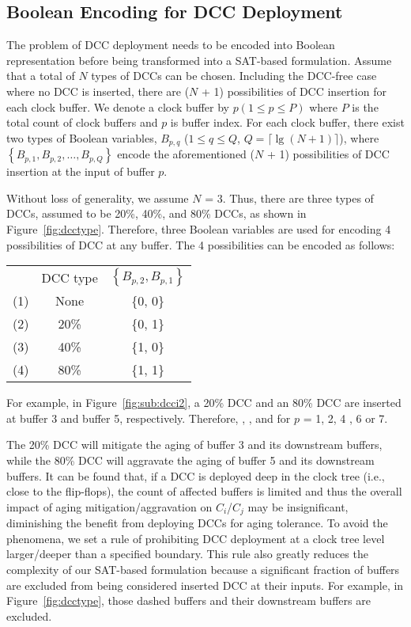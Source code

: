 \subsection{Boolean Encoding for DCC Deployment}
\label{subsec:eddcd}
The problem of DCC deployment needs to be encoded into Boolean representation before being transformed into a SAT-based formulation. Assume that a total of $N$ types of DCCs can be chosen. Including the DCC-free case where no DCC is inserted, there are ($N$ + 1) possibilities of DCC insertion for each clock buffer. We denote a clock buffer by $p\left(1 \leq p \leq P\right)$ where $P$ is the total count of clock buffers and $p$ is buffer index. For each clock buffer, there exist two types of Boolean variables, {\fontsize{9}{10}$B_{p,q}$} ($1 \leq q \leq Q $, $Q = \lceil \lg (N + 1)\rceil$), where {\fontsize{9}{10}$\left\{B_{p,1}, B_{p,2},\dotsc, B_{p,Q}\right\}$} encode the aforementioned ($N$ + 1) possibilities of DCC insertion at the input of buffer $p$.

Without loss of generality, we assume $N$ = 3. Thus, there are three types of DCCs, assumed to be 20\%, 40\%, and 80\% DCCs, as shown in Figure~\ref{fig:dcctype}. Therefore, three Boolean variables are used for encoding 4 possibilities of DCC at any buffer. The 4 possibilities can be encoded as follows:

{\small
\begin{tabular}{ c c c }
\centering
   & DCC type & $\left\{B_{p,2},B_{p,1}\right\}$ \\
  (1)\quad & None & \{0, 0\} \\
  (2)\quad & 20\% &  \{0, 1\} \\
  (3)\quad & 40\% &  \{1, 0\} \\
  (4)\quad & 80\% &  \{1, 1\} \\
\end{tabular}}



For example, in Figure~\ref{fig:sub:dcci2}, a 20\% DCC and an 80\% DCC are inserted at buffer 3 and buffer 5, respectively. Therefore, {}, {}, and {} for $p$ = 1, 2, 4 , 6 or 7.

The 20\% DCC will mitigate the aging of buffer 3 and its downstream buffers, while the 80\% DCC will aggravate the aging of buffer 5 and its downstream buffers. It can be found that, if a DCC is deployed deep in the clock tree (i.e., close to the flip-flops), the count of affected buffers is limited and thus the overall impact of aging mitigation/aggravation on $C_i$/$C_j$ may be insignificant, diminishing the benefit from deploying DCCs for aging tolerance.  To avoid the phenomena, we set a rule of prohibiting DCC deployment at a clock tree level larger/deeper than a specified boundary. This rule also greatly reduces the complexity of our SAT-based formulation because a significant fraction of buffers are excluded from being considered inserted DCC at their inputs. For example, in Figure~\ref{fig:dcctype}, those dashed buffers and their downstream buffers are excluded. 

